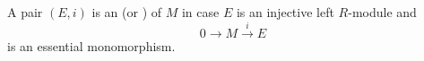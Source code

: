 A pair $(E, i)$ is an  (or ) of $M$ in case $E$ is an injective left $R$-module and
$$0 \to M \xrightarrow{i} E$$
is an essential monomorphism.
